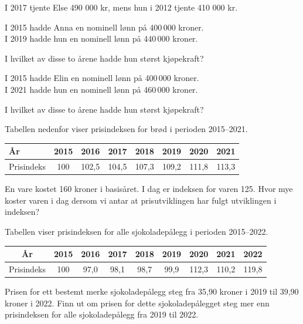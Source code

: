 I 2017 tjente Else 490 000 kr, mens hun i 2012 tjente 410 000 kr.

I 2015 hadde Anna en nominell lønn på 400\,000 kroner. \\
I 2019 hadde hun en nominell lønn på 440\,000 kroner.\os

I hvilket av disse to årene hadde hun størst kjøpekraft?

I 2015 hadde Elin en nominell lønn på 400\,000 kroner.\\
I 2021 hadde hun en nominell lønn på 460\,000 kroner.\os 

I hvilket av disse to årene hadde hun størst kjøpekraft?

Tabellen nedenfor viser prisindeksen for brød i perioden 2015--2021.

\begin{center}
	\small
	\begin{tabular}{|l|c|c|c|c|c|c|c|}
		\hline
		År & 2015 & 2016 & 2017 & 2018 & 2019 & 2020 & 2021 \\
		\hline
		Prisindeks & 100 & 102,5 & 104,5 & 107,3 & 109,2 & 111,8 & 113,3 \\
		\hline
	\end{tabular}
\end{center}


En vare kostet 160 kroner i basisåret. I dag er indeksen for varen 125.
Hvor mye koster varen i dag dersom vi antar at prisutviklingen har fulgt utviklingen i
indeksen?

Tabellen viser prisindeksen for alle sjokoladepålegg i perioden 2015–2022.
\begin{center}
		\centering
		\small
		\begin{tabular}{|c|c|c|c|c|c|c|c|c|}
			\hline
			År & 2015 & 2016 & 2017 & 2018 & 2019 & 2020 & 2021 & 2022 \\
			\hline
			Prisindeks & 100 & 97,0 & 98,1 & 98,7 & 99,9 & 112,3 & 110,2 & 119,8 \\
			\hline
		\end{tabular}
\end{center}
Prisen for ett bestemt merke sjokoladepålegg steg fra 35,90 kroner i 2019 til
39,90 kroner i 2022. Finn ut om prisen for dette sjokoladepålegget steg mer enn
prisindeksen for alle sjokoladepålegg fra 2019 til 2022.


